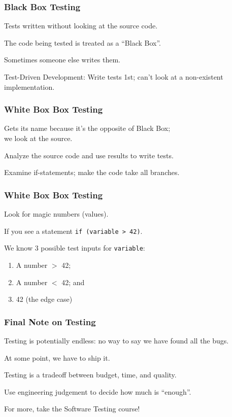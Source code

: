 \begin{frame}
\frametitle{Black Box Testing}
\begin{changemargin}{1cm}

Tests written without looking at the source code.

The code being tested is treated as a ``Black Box''.

Sometimes someone else writes them.

Test-Driven Development: Write tests 1st; can't look at a non-existent implementation.


\end{changemargin}
\end{frame}

\begin{frame}
\frametitle{White Box Box Testing}
\begin{changemargin}{1cm}

Gets its name because it's the opposite of Black Box;\\we look at the source.

Analyze the source code and use results to write tests. 

Examine if-statements; make the code take all branches.

\end{changemargin}
\end{frame}

\begin{frame}
\frametitle{White Box Box Testing}
\begin{changemargin}{1cm}

Look for magic numbers (values).

If you see a statement \texttt{if (variable > 42)}.

We know 3 possible test inputs for \texttt{variable}:
\begin{enumerate}
	\item A number $>$ 42;
    \item A number $<$ 42; and
    \item 42 (the edge case)
\end{enumerate}

\end{changemargin}
\end{frame}

\begin{frame}
\frametitle{Final Note on Testing}
\begin{changemargin}{1cm}

Testing is potentially endless: no way to say we have found all the bugs.

At some point, we have to ship it.

Testing is a tradeoff between budget, time, and quality.

Use engineering judgement to decide how much is ``enough''.

For more, take the Software Testing course!

\end{changemargin}
\end{frame}


